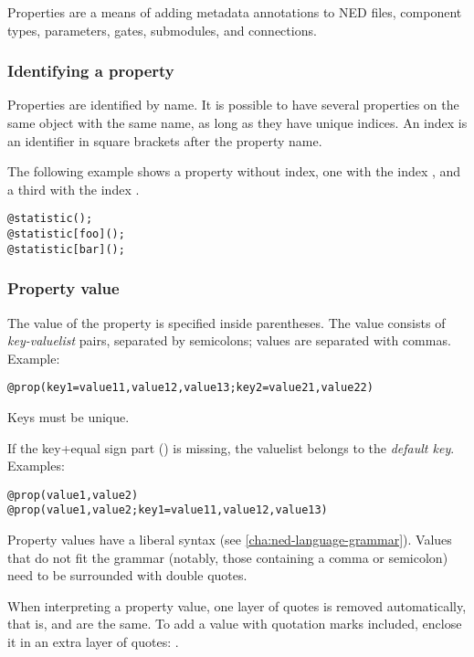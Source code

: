 Properties are a means of adding metadata annotations to NED files, component types,
parameters, gates, submodules, and connections.

\subsubsection{Identifying a property}

Properties are identified by name. It is possible to have several properties
on the same object with the same name, as long as they have unique indices.
An index is an identifier in square brackets after the property name.

The following example shows a property without index, one with the index ,
and a third with the index .

\begin{verbatim}
@statistic();
@statistic[foo]();
@statistic[bar]();
\end{verbatim}


\subsubsection{Property value}

The value of the property is specified inside parentheses. The value consists of
\textit{key-valuelist} pairs, separated by semicolons; values are separated with commas.
Example:

\begin{verbatim}
@prop(key1=value11,value12,value13;key2=value21,value22)
\end{verbatim}

Keys must be unique.

If the key+equal sign part () is missing, the valuelist belongs
to the \textit{default key}. Examples:

\begin{verbatim}
@prop(value1,value2)
@prop(value1,value2;key1=value11,value12,value13)
\end{verbatim}

Property values have a liberal syntax (see \ref{cha:ned-language-grammar}).
Values that do not fit the grammar (notably, those containing a comma or
semicolon) need to be surrounded with double quotes.

When interpreting a property value, one layer of quotes is removed
automatically, that is,  and  are the same. To add a
value with quotation marks included, enclose it in an extra layer of
quotes: .

